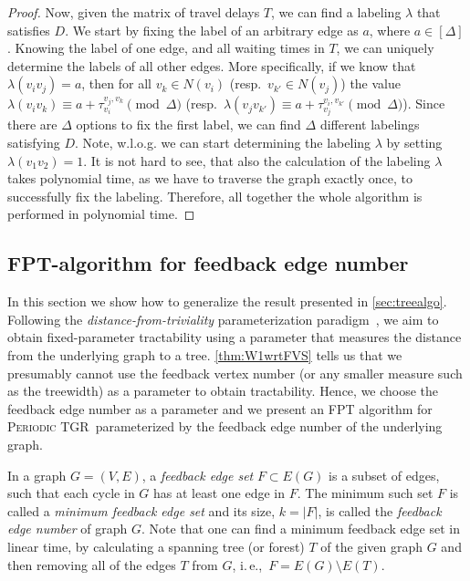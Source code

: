 \documentclass[a4paper,UKenglish,cleveref, autoref, thm-restate]{lipics-v2021}
\newcommand{\ie}{i.\,e.,\ }
\newcommand{\deltaExact}{\textsc{Periodic TGR}}
\begin{document}
\begin{proof}
    Now, given the matrix of travel delays $T$, we can find a labeling $\lambda$ that satisfies $D$.
    We start by fixing the label of an arbitrary edge as $a$, where $a \in [\Delta]$.
    Knowing the label of one edge, and all waiting times in $T$, we can uniquely determine the labels of all other edges.
    More specifically, if we know that $\lambda(v_i v_j) = a$, then for all $v_k \in N(v_i)$ (resp.~$v_{k'} \in N(v_j)$)
    the value $\lambda(v_iv_k) \equiv a + \tau_{v_i}^{v_j,v_k} \pmod \Delta $ (resp.~$\lambda(v_j v_{k'}) \equiv a + \tau_{v_j}^{v_i,v_{k'}} \pmod \Delta $).
    Since there are $\Delta$ options to fix the first label, we can find $\Delta$ different labelings satisfying $D$.
    Note, w.l.o.g. we can start determining the labeling $\lambda$ by setting $\lambda(v_1v_2) = 1$.
    It is not hard to see, that also the calculation of the labeling $\lambda$ takes polynomial time, as we have to traverse the graph exactly once, to successfully fix the labeling. Therefore, all together the whole algorithm is performed in polynomial time.
\end{proof}






\subsection{FPT-algorithm for feedback edge number}\label{sec:FPT}






In this section we show how to generalize the result presented in \cref{sec:treealgo}. Following the \emph{distance-from-triviality} parameterization paradigm~\cite{FJR13,GHN04}, we aim to obtain fixed-parameter tractability using a parameter that measures the distance from the underlying graph to a tree. \cref{thm:W1wrtFVS} tells us that we presumably cannot use the feedback vertex number (or any smaller measure such as the treewidth) as a parameter to obtain tractability. Hence, we choose the feedback edge number as a parameter and we present an FPT algorithm for \deltaExact\ parameterized by the feedback edge number of the underlying graph.

In a graph $G=(V,E)$, a \emph{feedback edge set} $F \subset E(G)$ is a subset of edges, such that each cycle in $G$ has at least one edge in $F$.
The minimum such set $F$ is called a  \emph{minimum feedback edge set} and its size, $k = |F|$, is called the \emph{feedback edge number} of graph $G$.
Note that one can find a minimum feedback edge set in linear time, by calculating a spanning tree (or forest) $T$ of the given graph $G$ and then removing all of the edges $T$ from $G$, \ie $F = E(G) \setminus E(T)$.
\end{document}

